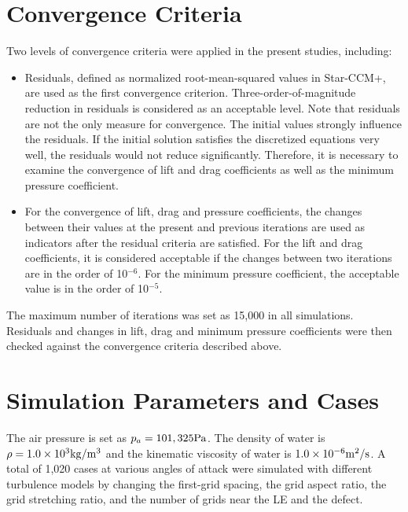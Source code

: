 \documentclass[onecolumn,11pt]{report}
\begin{document}
\section{Convergence Criteria}

Two levels of convergence criteria were applied in the present studies, including:

\begin{itemize}

\item Residuals, defined as normalized root-mean-squared values in Star-CCM+, are used as the first convergence criterion. Three-order-of-magnitude reduction in residuals is considered as an acceptable level. Note that residuals are not the only measure for convergence. The initial values strongly influence the residuals. If the initial solution satisfies the discretized equations very well, the residuals would not reduce  significantly. Therefore, it is necessary to examine the convergence of lift and drag coefficients as well as the minimum pressure coefficient. 

\item For the convergence of lift, drag and pressure coefficients, the changes between their values at the present and previous iterations are used as indicators after the residual criteria are satisfied. For the lift and drag coefficients, it is considered acceptable if the changes between two iterations are in the order of 10$^{-6}$. For the minimum pressure coefficient, the acceptable value is in the order of 10$^{-5}$. 

\end{itemize}

The maximum number of iterations was set as 15,000 in all simulations. Residuals and changes in lift, drag and minimum pressure coefficients were then checked against the convergence criteria described above. 

\clearpage

\section{Simulation Parameters and Cases}

The air pressure is set as $p_a=101,325\rm Pa$. The density of water is $\rho=1.0\times 10^3\rm kg/m^3$ and the kinematic viscosity of water is $1.0\times 10^{-6}\rm m^2/s$. A total of 1,020 cases at various angles of attack were simulated with different turbulence models by changing the first-grid spacing, the grid aspect ratio, the grid stretching ratio, and the number of grids near the LE and the defect.
\end{document}
